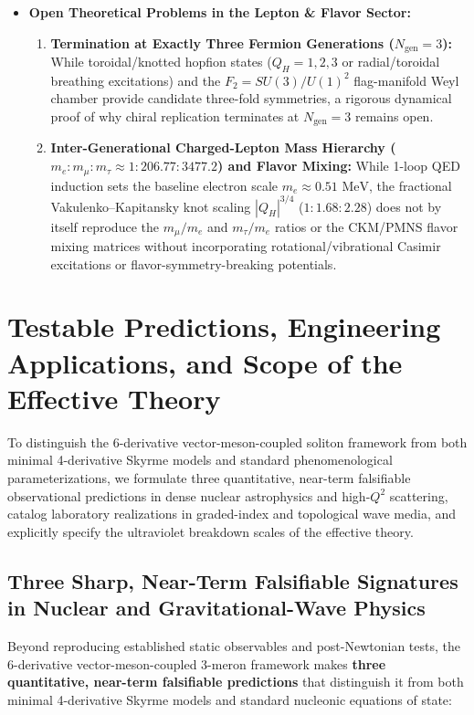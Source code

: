 \documentclass[10pt,aps,prd,twocolumn,superscriptaddress,nofootinbib,floatfix,longbibliography,showkeys]{revtex4-2}
\begin{document}
\begin{itemize}
\begin{enumerate}
  \end{enumerate}
  \item \textbf{Open Theoretical Problems in the Lepton \& Flavor Sector:}
  \begin{enumerate}
    \item \textbf{Termination at Exactly Three Fermion Generations ($N_{\text{gen}} = 3$):} While toroidal/knotted hopfion states ($Q_H = 1, 2, 3$ or radial/toroidal breathing excitations) and the $F_2 = SU(3)/U(1)^2$ flag-manifold Weyl chamber provide candidate three-fold symmetries, a rigorous dynamical proof of why chiral replication terminates at $N_{\text{gen}} = 3$ remains open.
    \item \textbf{Inter-Generational Charged-Lepton Mass Hierarchy ($m_e : m_\mu : m_\tau \approx 1 : 206.77 : 3477.2$) and Flavor Mixing:} While 1-loop QED induction sets the baseline electron scale $m_e \approx 0.51\text{ MeV}$, the fractional Vakulenko--Kapitansky knot scaling $|Q_H|^{3/4}$ ($1 : 1.68 : 2.28$) does not by itself reproduce the $m_\mu / m_e$ and $m_\tau / m_e$ ratios or the CKM/PMNS flavor mixing matrices without incorporating rotational/vibrational Casimir excitations or flavor-symmetry-breaking potentials.

  \end{enumerate}
\end{itemize}


\section{Testable Predictions, Engineering Applications, and Scope of the Effective Theory}\label{sec:8}

To distinguish the 6-derivative vector-meson-coupled soliton framework from both minimal 4-derivative Skyrme models and standard phenomenological parameterizations, we formulate three quantitative, near-term falsifiable observational predictions in dense nuclear astrophysics and high-$Q^2$ scattering, catalog laboratory realizations in graded-index and topological wave media, and explicitly specify the ultraviolet breakdown scales of the effective theory.


\subsection{Three Sharp, Near-Term Falsifiable Signatures in Nuclear and Gravitational-Wave Physics}\label{sec:8.1}

Beyond reproducing established static observables and post-Newtonian tests, the 6-derivative vector-meson-coupled 3-meron framework makes \textbf{three quantitative, near-term falsifiable predictions} that distinguish it from both minimal 4-derivative Skyrme models and standard nucleonic equations of state:
\end{document}
